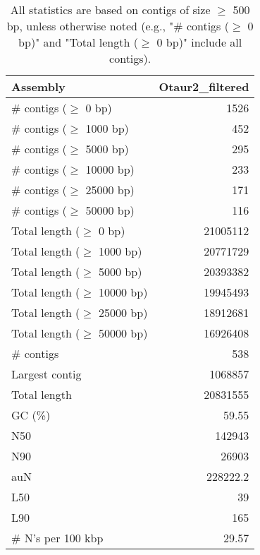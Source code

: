 \documentclass[12pt,a4paper]{article}
\begin{document}
\begin{table}[ht]
\begin{center}
\caption{All statistics are based on contigs of size $\geq$ 500 bp, unless otherwise noted (e.g., "\# contigs ($\geq$ 0 bp)" and "Total length ($\geq$ 0 bp)" include all contigs).}
\begin{tabular}{|l*{1}{|r}|}
\hline
Assembly & Otaur2\_filtered \\ \hline
\# contigs ($\geq$ 0 bp) & 1526 \\ \hline
\# contigs ($\geq$ 1000 bp) & 452 \\ \hline
\# contigs ($\geq$ 5000 bp) & 295 \\ \hline
\# contigs ($\geq$ 10000 bp) & 233 \\ \hline
\# contigs ($\geq$ 25000 bp) & 171 \\ \hline
\# contigs ($\geq$ 50000 bp) & 116 \\ \hline
Total length ($\geq$ 0 bp) & 21005112 \\ \hline
Total length ($\geq$ 1000 bp) & 20771729 \\ \hline
Total length ($\geq$ 5000 bp) & 20393382 \\ \hline
Total length ($\geq$ 10000 bp) & 19945493 \\ \hline
Total length ($\geq$ 25000 bp) & 18912681 \\ \hline
Total length ($\geq$ 50000 bp) & 16926408 \\ \hline
\# contigs & 538 \\ \hline
Largest contig & 1068857 \\ \hline
Total length & 20831555 \\ \hline
GC (\%) & 59.55 \\ \hline
N50 & 142943 \\ \hline
N90 & 26903 \\ \hline
auN & 228222.2 \\ \hline
L50 & 39 \\ \hline
L90 & 165 \\ \hline
\# N's per 100 kbp & 29.57 \\ \hline
\end{tabular}
\end{center}
\end{table}
\end{document}
